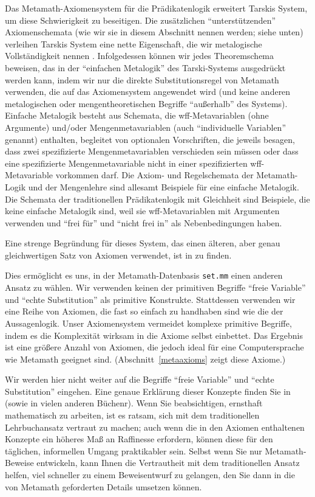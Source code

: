 Das Metamath-Axiomensystem für die Prädikatenlogik erweitert Tarskis System, um diese Schwierigkeit zu beseitigen. Die zusätzlichen "`unter\-stüt\-zen\-den"' Axiomenschemata (wie wir sie in diesem Abschnitt nennen werden; siehe unten) verleihen Tarskis System eine nette Eigenschaft, die wir metalogische Vollständigkeit nennen \cite[Remark 9.6]{Megill}. Infolgedessen können wir jedes Theoremschema beweisen, das in der "`einfachen Metalogik"' des Tarski-Systems ausgedrückt werden kann, indem wir nur die direkte Substitutionsregel von Metamath verwenden, die auf das Axiomensystem angewendet wird (und keine anderen metalogischen oder mengentheoretischen Begriffe "`außerhalb"' des Systems). Einfache Metalogik besteht aus Schemata, die wff-Metavariablen (ohne Argumente) und/oder Mengenmetavariablen (auch "`individuelle Variablen"' genannt) enthalten, begleitet von optionalen Vorschriften, die jeweils besagen, dass zwei spezifizierte Mengenmetavariablen verschieden sein müssen oder dass eine spezifizierte Mengenmetavariable nicht in einer spezifizierten wff-Metavariable vorkommen darf. Die Axiom- und Regelschemata der Metamath-Logik und der Mengenlehre sind allesamt Beispiele für eine einfache Metalogik. Die Schemata der traditionellen Prädikatenlogik mit Gleichheit sind Beispiele, die keine einfache Metalogik sind, weil sie wff-Metavariablen mit Argumenten verwenden und "`frei für"' und "`nicht frei in"' als Nebenbedingungen haben.

Eine strenge Begründung für dieses System, das einen älteren, aber genau gleichwertigen Satz von Axiomen verwendet, ist in \cite{Megill} zu finden.

Dies ermöglicht es uns, in der Metamath-Datenbasis \texttt{set.mm} einen anderen Ansatz zu wählen.  Wir verwenden keinen der primitiven Begriffe "`freie Variable"' und "`echte Substitution"' als primitive Konstrukte. Stattdessen verwenden wir eine Reihe von Axiomen, die fast so einfach zu handhaben sind wie die der Aussagenlogik.  Unser Axiomensystem vermeidet komplexe primitive Begriffe, indem es die Komplexität wirksam in die Axiome selbst einbettet.  Das Ergebnis ist eine größere Anzahl von Axiomen, die jedoch ideal für eine Computersprache wie Metamath geeignet sind. (Abschnitt~\ref{metaaxioms} zeigt diese Axiome.)

Wir werden hier nicht weiter auf die Begriffe "`freie Variable"' und "`echte Substitution"' eingehen.  Eine genaue Erklärung dieser Konzepte finden Sie in \cite[ch.\ 3--4]{Hamilton} (sowie in vielen anderen Büchenr).  Wenn Sie beabsichtigen, ernsthaft mathematisch zu arbeiten, ist es ratsam, sich mit dem traditionellen Lehrbuchansatz vertraut zu machen; auch wenn die in den Axiomen enthaltenen Konzepte ein höheres Maß an Raffinesse erfordern, können diese für den täglichen, informellen Umgang praktikabler sein.  Selbst wenn Sie nur Metamath-Beweise entwickeln, kann Ihnen die Vertrautheit mit dem traditionellen Ansatz helfen, viel schneller zu einem Beweisentwurf zu gelangen, den Sie dann in die von Metamath geforderten Details umsetzen können.


